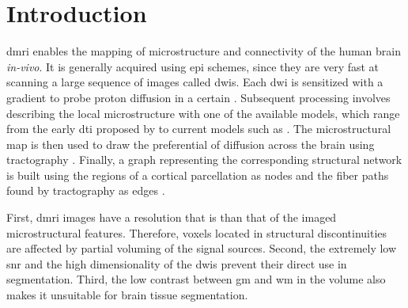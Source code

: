 \section{Introduction}\label{sec:regseg-intro}
\Acrlong*{dmri} enables the mapping of microstructure \citep{basser_microstructural_1996}
  and connectivity \citep{craddock_imaging_2013} of the human brain \emph{in-vivo}.
It is generally acquired using \gls*{epi} schemes, since they are very fast at
  scanning a large sequence of images called \glspl*{dwi}.
Each \gls*{dwi} is sensitized with a gradient to probe proton diffusion in a certain
  .
Subsequent processing involves describing the local microstructure with one of the available
  models, which range from the early \gls*{dti} proposed by \cite{basser_microstructural_1996}
  to current models such as \citep{daducci_accelerated_2015}.
The microstructural map is then used to draw the preferential  of diffusion
  across the brain using tractography \citep{mori_threedimensional_1999}.
Finally, a graph representing the corresponding structural network is built using
  the regions of a cortical parcellation as nodes and the fiber paths found by
  tractography as edges \citep{hagmann_mapping_2008}.

First, \gls{dmri} images have a resolution that is 
  than that of the imaged microstructural features.
Therefore, voxels located in structural discontinuities are affected by partial
  voluming of the signal sources.
Second, the extremely low \gls*{snr} and the high dimensionality of the \glspl*{dwi} prevent
  their direct use in segmentation.
Third, the low contrast between \gls*{gm} and \gls*{wm} in the \lowb{} volume also makes
  it unsuitable for brain tissue segmentation.

